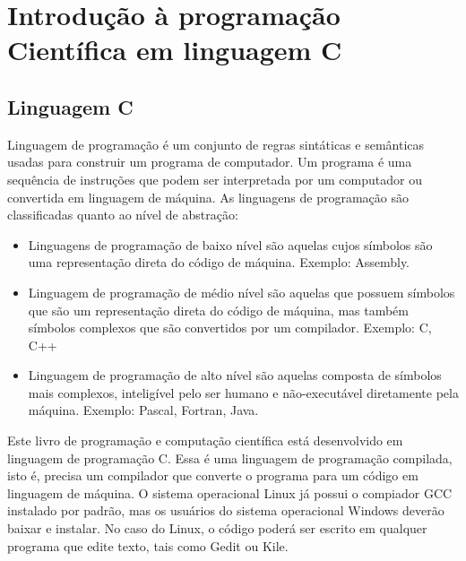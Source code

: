 

\chapter{Introdução à programação Científica em linguagem C}
\section{Linguagem C}
Linguagem de programação é um conjunto de regras sintáticas e semânticas usadas para construir um programa de computador. Um programa é uma sequência de instruções que podem ser interpretada por um computador ou convertida em linguagem de máquina.
As linguagens de programação são classificadas quanto ao nível de abstração:
\begin{itemize}
\item Linguagens de programação de baixo nível são aquelas cujos símbolos são uma representação direta do código de máquina. Exemplo: Assembly.

\item Linguagem de programação de médio nível são aquelas que possuem símbolos que são um representação direta do código de máquina, mas também símbolos complexos que são convertidos por um compilador. Exemplo: C, C++

\item Linguagem de programação de alto nível são aquelas composta de símbolos mais complexos, inteligível pelo ser humano e não-executável diretamente pela máquina. Exemplo: Pascal, Fortran, Java.
\end{itemize}

Este livro de programação e computação científica está desenvolvido em linguagem de programação C. Essa é uma linguagem de programação compilada, isto é, precisa um compilador que converte o programa para um código em linguagem de máquina. O sistema operacional Linux já possui o compiador GCC instalado por padrão, mas os usuários do sistema operacional Windows deverão baixar e instalar. No caso do Linux, o código poderá ser escrito em qualquer programa que edite texto, tais como Gedit ou Kile.


